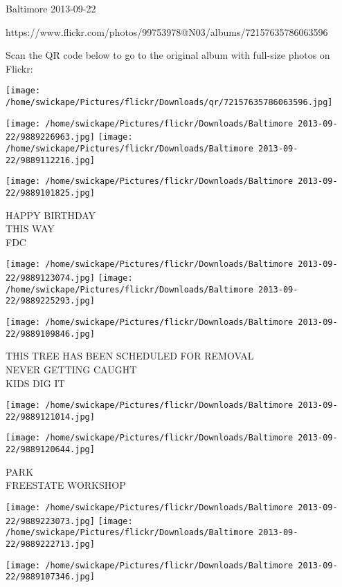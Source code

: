 \documentclass[10pt,letterpaper]{article}
\begin{document}
Baltimore 2013-09-22

https://www.flickr.com/photos/99753978@N03/albums/72157635786063596

Scan the QR code below to go to the original album with full-size photos on Flickr:

\texttt{[image: /home/swickape/Pictures/flickr/Downloads/qr/72157635786063596.jpg]}
\pagebreak

\texttt{[image: /home/swickape/Pictures/flickr/Downloads/Baltimore 2013-09-22/9889226963.jpg]}
\texttt{[image: /home/swickape/Pictures/flickr/Downloads/Baltimore 2013-09-22/9889112216.jpg]}

\vspace{0.25in}
\texttt{[image: /home/swickape/Pictures/flickr/Downloads/Baltimore 2013-09-22/9889101825.jpg]}

HAPPY BIRTHDAY\\
THIS WAY\\
FDC\\
\pagebreak

\texttt{[image: /home/swickape/Pictures/flickr/Downloads/Baltimore 2013-09-22/9889123074.jpg]}
\texttt{[image: /home/swickape/Pictures/flickr/Downloads/Baltimore 2013-09-22/9889225293.jpg]}

\texttt{[image: /home/swickape/Pictures/flickr/Downloads/Baltimore 2013-09-22/9889109846.jpg]}

THIS TREE HAS BEEN SCHEDULED FOR REMOVAL\\
NEVER GETTING CAUGHT\\
KIDS DIG IT\\
\pagebreak

\texttt{[image: /home/swickape/Pictures/flickr/Downloads/Baltimore 2013-09-22/9889121014.jpg]}

\vspace{0.25in}
\texttt{[image: /home/swickape/Pictures/flickr/Downloads/Baltimore 2013-09-22/9889120644.jpg]}

PARK\\
FREESTATE WORKSHOP\\
\pagebreak

\texttt{[image: /home/swickape/Pictures/flickr/Downloads/Baltimore 2013-09-22/9889223073.jpg]}
\texttt{[image: /home/swickape/Pictures/flickr/Downloads/Baltimore 2013-09-22/9889222713.jpg]}

\texttt{[image: /home/swickape/Pictures/flickr/Downloads/Baltimore 2013-09-22/9889107346.jpg]}
\end{document}
